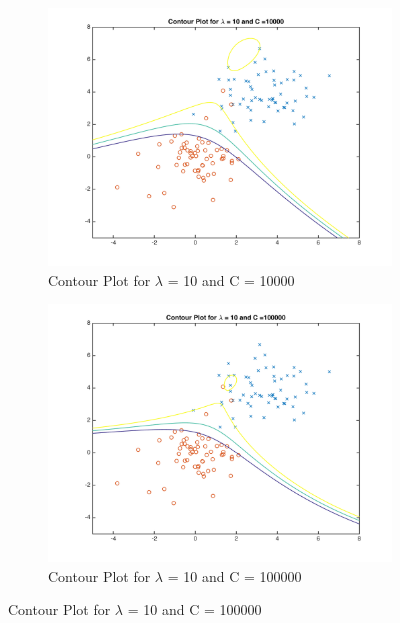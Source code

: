 \documentclass[english]{article}
\begin{document}
\begin{figure}[!htbp]
\begin{subfigure}{0.48\textwidth}
\includegraphics[width=\linewidth]{../plotC/plot_C_10000}
\caption{Contour Plot for $\lambda$ = 10 and C = 10000} 
\end{subfigure}\hspace*{\fill}
\begin{subfigure}{0.48\textwidth}
\includegraphics[width=\linewidth]{../plotC/plot_C_100000}
\caption{Contour Plot for $\lambda$ = 10 and C = 100000} \label{fig:b}
\end{subfigure}

\end{figure}
\end{document}
